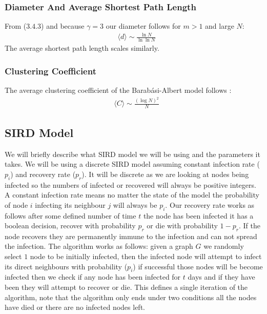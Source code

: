 \documentclass{article}
\begin{document}
            \subsubsection{Diameter And Average Shortest Path Length}
            From ($3.4.3$) and because $\gamma = 3$ our diameter follows for $m>1$ and large $N$:
            \begin{align*}
                &\langle d \rangle \sim \frac{\ln N}{\ln \ln N}
            \end{align*}
            The average shortest path length scales similarly.
            \subsubsection{Clustering Coefficient}
            The average clustering coefficient of the Barabási-Albert model follows \parencite{barabasi2013network}\parencite{klemm2002growing}:
            \begin{align*}
                &\langle C \rangle \sim \frac{(\log N)^2}{N}
            \end{align*}
        \subsection{SIRD Model}
        We will briefly describe what SIRD model we will be using and the parameters it takes. We will be using a discrete SIRD model assuming constant infection rate ($p_i$) and recovery rate ($p_r$). It will be discrete as we are looking at nodes being infected so the numbers of infected or recovered will always be positive integers. A constant infection rate means no matter the state of the model the probability of node $i$ infecting its neighbour $j$ will always be $p_i$. Our recovery rate works as follows after some defined number of time $t$ the node has been infected it has a boolean decision, recover with probability $p_r$ or die with probability $1-p_r$. If the node recovers they are permanently immune to the infection and can not spread the infection. The algorithm works as follows: given a graph $G$ we randomly select $1$ node to be initially infected, then the infected node will attempt to infect its direct neighbours with probability ($p_i$) if successful those nodes will be become infected then we check if any node has been infected for $t$ days and if they have been they will attempt to recover or die. This defines a single iteration of the algorithm, note that the algorithm only ends under two conditions all the nodes have died or there are no infected nodes left.
\end{document}
